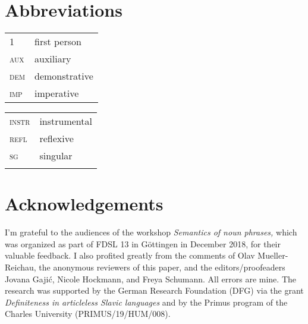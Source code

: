 \documentclass[output=paper,colorlinks,citecolor=brown,newtxmath]{langscibook}
\begin{document}
\section*{Abbreviations}

\begin{tabularx}{.5\textwidth}{@{}lX@{}}
\textsc{1}&first person\\
\textsc{aux}&auxiliary\\
\textsc{dem}&demonstrative\\
\textsc{imp}&imperative\\
\end{tabularx}%
\begin{tabularx}{.5\textwidth}{@{}lX@{}}
\textsc{instr}&instrumental\\
\textsc{refl}&reflexive\\
\textsc{sg}&singular\\
&\\
\end{tabularx}

\section*{Acknowledgements}
I'm grateful to the audiences of the workshop \textit{Semantics of noun phrases,} which was organized as part of FDSL 13 in Göttingen in December 2018, for their valuable feedback. I also profited greatly from the comments of Olav Mueller-Reichau, the anonymous reviewers of this paper, and the editors/proofeaders Jovana Gajić, Nicole Hockmann, and Freya Schumann. All errors are mine. The research was supported by the German Research Foundation (DFG) via the grant \textit{Definiteness in articleless Slavic languages} and by the Primus program of the Charles University (PRIMUS/19/HUM/008).

\sloppy
\printbibliography[heading=subbibliography,notkeyword=this]


\end{document}
